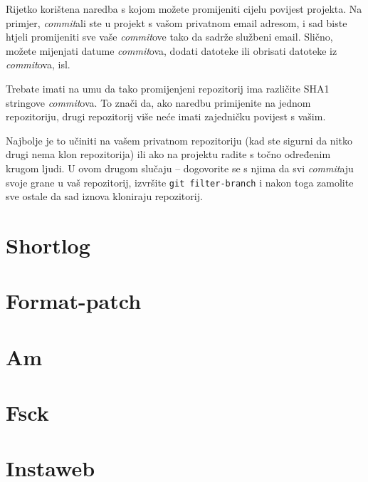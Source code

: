 Rijetko korištena naredba s kojom možete promijeniti cijelu povijest projekta.
Na primjer, \emph{commit}ali ste u projekt s vašom privatnom email adresom, i sad biste htjeli promijeniti sve vaše \emph{commit}ove tako da sadrže službeni email.
Slično, možete mijenjati datume \emph{commit}ova, dodati datoteke ili obrisati datoteke iz \emph{commit}ova, isl.

Trebate imati na umu da tako promijenjeni repozitorij ima različite SHA1 stringove \emph{commit}ova.
To znači da, ako naredbu primijenite na jednom repozitoriju, drugi repozitorij više neće imati zajedničku povijest s vašim.

Najbolje je to učiniti na vašem privatnom repozitoriju (kad ste sigurni da nitko drugi nema klon repozitorija) ili ako na projektu radite s točno određenim krugom ljudi.
U ovom drugom slučaju -- dogovorite se s njima da svi \emph{commit}aju svoje grane u vaš repozitorij, izvršite \verb+git filter-branch+ i nakon toga zamolite sve ostale da sad iznova kloniraju repozitorij.

\section*{Shortlog}

\TODO

\section*{Format-patch}

\TODO

\section*{Am}

\TODO

\section*{Fsck}

\TODO

\section*{Instaweb}

\TODO

